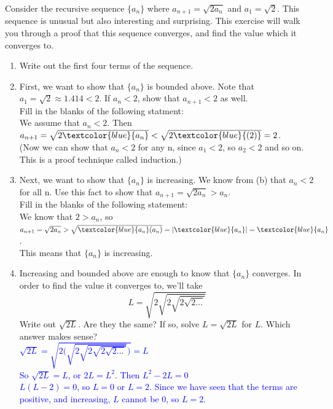 \documentclass{ximera}
\begin{document}
\begin{exercise}
     Consider the recursive sequence $\{a_n\}$ where $a_{n+1}=\sqrt{2a_n}$ and $a_1=\sqrt{2}$. This sequence is unusual but also interesting and surprising.  This exercise will walk you through a proof that this sequence converges, and find the value which it converges to.
\begin{enumerate}
    \item Write out the first four terms of the sequence.
    \vspace{.5in}
    \item First, we want to show that $\{a_n\}$ is bounded above. Note that $a_1=\sqrt{2}\approx1.414<2$.  If $a_n<2$, show that $a_{n+1}<2$ as well.  \\
    Fill in the blanks of the following statment:\\
    We assume that $a_n<2$.  Then $a_{n+1}=\sqrt{2\textcolor{blue}{a_n}}<\sqrt{2\textcolor{blue}{(2)}}=2$.\\
    (Now we can show that $a_n<2$ for any n, since $a_1<2$, so $a_2<2$ and so on. This is a proof technique called induction.)
    \item Next, we want to show that $\{a_n\}$ is increasing.  We know from (b) that $a_n<2$ for all n.  Use this fact to show that $a_{n+1}=\sqrt{2a_n}>a_n.$\\
    Fill in the blanks of the following statement:\\
    We know that $2>a_n$, so $a_{n+1}=\sqrt{2a_n}>\sqrt{\textcolor{blue}{a_n}(a_n)}=|\textcolor{blue}{a_n}|=\textcolor{blue}{a_n}$. \\
    This means that $\{a_n\}$ is increasing.
    \item Increasing and bounded above are enough to know that $\{a_n\}$ converges.  In order to find the value it converges to, we'll take $$L=\sqrt{2\sqrt{2\sqrt{2\sqrt{2\dots}}}}$$  Write out $\sqrt{2L}$.  Are they the same?  If so, solve $L=\sqrt{2L}$ for $L$.  Which answer makes sense?\\
    \textcolor{blue}{ $\sqrt{2L}=\sqrt{2\bigg(\sqrt{2\sqrt{2\sqrt{2\sqrt{2\dots}}}}\bigg)}=L$\\
    So $\sqrt{2L}=L$, or $2L=L^2$.  Then $L^2-2L=0$\\
    $L(L-2)=0$, so $L=0$ or $L=2$.  Since we have seen that the terms are positive, and increasing, $L$ cannot be 0, so $L=2$.}
\end{enumerate}

\end{exercise}
\end{document}
